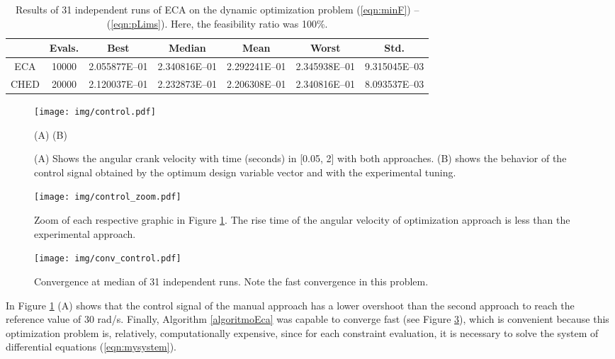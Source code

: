 \documentclass[12pt,letterpape]{article}
\begin{document}
\begin{table}[!ht]
	\centering
	\begin{tabular}{ccccccc}
		\hline
		& {\bf Evals.} & {\bf Best} & {\bf Median} & {\bf Mean} & {\bf Worst} & {\bf Std.} \\ \hline
		ECA & 10000 & 2.055877E--01 & 2.340816E--01 & 2.292241E--01 & 2.345938E--01 & 9.315045E--03 \\ \hline
		CHED & 20000 & 2.120037E--01 & 2.232873E--01 & 2.206308E--01 & 2.340816E--01 & 8.093537E--03 \\ \hline
	\end{tabular}
	\caption{Results of 31 independent runs of ECA on the dynamic optimization
	problem (\ref{eqn:minF}) -- (\ref{eqn:pLims}). Here, the feasibility ratio was 100\%.}
	\label{tab:res2}
\end{table}
% 
% 
% 
% 
\begin{figure}[!ht]
	\centering
	\texttt{[image: img/control.pdf]}
	\begin{center}
		(A) \hspace{0.4\linewidth} (B)
	\end{center}
	\caption{(A) Shows the angular crank velocity with time (seconds) in [0.05, 2]
	with both approaches. (B) shows the behavior of the control signal obtained
	by the optimum design variable vector and with the experimental tuning.}
	\label{fig:tunning}
\end{figure}
% 
% 
% 
\begin{figure}[!ht]
	\centering
	\texttt{[image: img/control\_zoom.pdf]}
	\caption{Zoom of each respective graphic in Figure \ref{fig:tunning}. The
	rise time of the angular velocity of optimization approach is less than the
	experimental approach.}
	\label{fig:tunningZoom}
\end{figure}
% 
% 
\begin{figure}[!ht]
	\centering
	\texttt{[image: img/conv\_control.pdf]}
	\caption{Convergence at median of 31 independent runs. Note the fast convergence
	in this problem.}
	\label{fig:convMedian2}
\end{figure}

In Figure \ref{fig:tunning} (A) shows that the control signal of the manual
approach has a lower overshoot than the second approach to reach the reference
value of 30 rad/s.
% 
Finally, Algorithm \ref{algoritmoEca} was capable to converge fast (see Figure \ref{fig:convMedian2}),
which is convenient because this optimization problem is, relatively,
computationally expensive, since for each constraint evaluation, it is necessary
to solve the system of differential equations (\ref{eqn:mysystem}).
\end{document}
